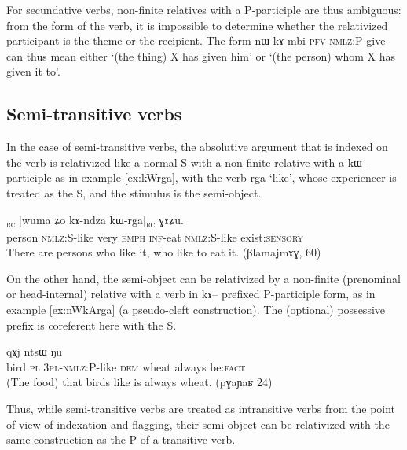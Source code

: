 \documentclass[oldfontcommands,oneside,a4paper,11pt]{article}
\newcommand{\ipa}[1]{{\phon #1}} %
\newcommand{\topic}{\textsc{dem}}
\newcommand{\tete}{\textsuperscript{\textsc{head}}}
\newcommand{\rc}{\textsubscript{\textsc{rc}}}
\begin{document}
For secundative verbs, non-finite relatives with a P-participle are thus ambiguous: from the form of the verb, it is impossible to determine whether the relativized participant is the theme or the recipient. The form \ipa{nɯ-kɤ-mbi} \textsc{pfv-nmlz}:P-give can thus mean either `(the thing) X has given him' or `(the person) whom X has given it to'.

\subsection{Semi-transitive verbs}
In the case of semi-transitive verbs, the absolutive argument that is indexed on the verb is relativized like a normal S with a non-finite relative with a \ipa{kɯ--} participle as in example \ref{ex:kWrga}, with the verb \ipa{rga} `like', whose experiencer is treated as the S, and the stimulus is the semi-object.

 \begin{exe}
   \ex   \label{ex:kWrga}
 \gll  [\textbf{\ipa{tɯrme}}\tete{}  	\ipa{kɯ-rga,}]\rc{}  	[\ipa{wuma}  	\ipa{ʑo}  	\ipa{kɤ-ndza}  	\ipa{kɯ-rga}]\rc{}  	\ipa{ɣɤʑu.} \\
person \textsc{nmlz:S}-like very \textsc{emph} \textsc{inf}-eat  \textsc{nmlz:S}-like exist:\textsc{sensory} \\
 \glt  There are persons who like it, who like to eat it. (\ipa{βlamajmɤɣ}, 60)
   \end{exe} 
   
   On the other hand, the semi-object can be relativized by a non-finite (prenominal or head-internal) relative with a verb in \ipa{kɤ--} prefixed P-participle form, as in example \ref{ex:nWkArga} (a pseudo-cleft construction). The (optional) possessive prefix is coreferent here with the S.
   
    \begin{exe}
   \ex   \label{ex:nWkArga}  
\gll [\ipa{pɣa}  	\ipa{ra}  	\ipa{nɯ-kɤ-rga}]  	\ipa{nɯ}  	\ipa{qɤj}  	\ipa{ntsɯ}  	\ipa{ŋu}  \\
bird \textsc{pl} \textsc{3pl-nmlz:P}-like \topic{} wheat always be:\textsc{fact} \\
\glt (The food) that birds like is always wheat. (\ipa{pɣaɲaʁ} 24)
   \end{exe} 

Thus, while semi-transitive verbs are  treated as intransitive verbs from the point of view of indexation and flagging, their semi-object can be relativized with the same construction as the P of a transitive verb.
\end{document}
